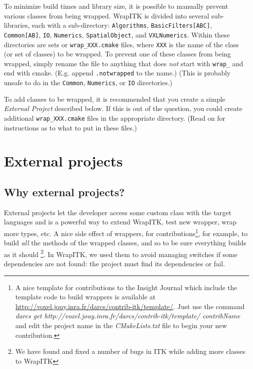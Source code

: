 \documentclass{InsightArticle}
\begin{document}
To minimize build times and library size, it is possible to manually prevent
various classes from being wrapped. WrapITK is divided into several
sub-libraries, each with a sub-directory: \verb$Algorithms$, \verb$BasicFilters[ABC]$,
\verb$Common[AB]$, \verb$IO$, \verb$Numerics$, \verb$SpatialObject$, and \verb$VXLNumerics$. Within these
directories are sets or \verb$wrap_XXX.cmake$ files, where \verb$XXX$ is the name of the class
(or set of classes) to be wrapped. To prevent one of these classes from being
wrapped, simply rename the file to anything that does {\em not} start with \verb$wrap_$ and
end with cmake. (E.g. append \verb$.notwrapped$ to the name.) (This is probably
unsafe to do in the \verb$Common$, \verb$Numerics$, or \verb$IO$ directories.)

To add classes to be wrapped, it is recommended that you create a simple
{\em External Project} described below. If this is out of the question, you could
create additional \verb$wrap_XXX.cmake$ files in the appropriate directory. (Read on
for instructions as to what to put in these files.)


  \section{External projects}

    \subsection{Why external projects?}

External projects let the developer access some custom class with the target languages
and is a powerful way to extend WrapITK, test new wrapper, wrap more types, etc.
A nice side effect of wrappers, for contributions\footnote{A nice template for
contributions to the Insight Journal \cite{InsightJournalWebSite} which include the 
template code to build wrappers is available at
\url{http://voxel.jouy.inra.fr/darcs/contrib-itk/template/}. Just use the command
{\em darcs get http://voxel.jouy.inra.fr/darcs/contrib-itk/template/ contribName}
and edit the project name in the {\em CMakeLists.txt} file to
begin your new contribution.}, for example, to build {\em all}
the methods of the wrapped classes, and so to be sure everything builds as it should
\footnote{We have found and fixed  a number of bugs in ITK while adding
more classes to WrapITK}.
In WrapITK, we used them to avoid managing switches if some dependencies are not
found: the project must find its dependencies or fail.
\end{document}
